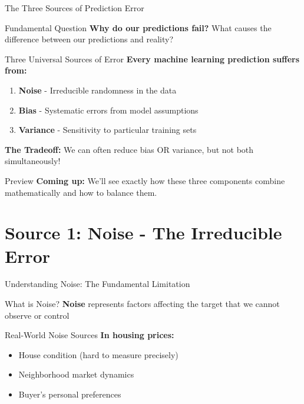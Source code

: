 \documentclass[10pt]{beamer}
\begin{document}
\begin{frame}{The Three Sources of Prediction Error}
\begin{alertbox}{Fundamental Question}
\textbf{Why do our predictions fail?} What causes the difference between our predictions and reality?
\end{alertbox}

\begin{definitionbox}{Three Universal Sources of Error}
\textbf{Every machine learning prediction suffers from:}
\begin{enumerate}
\item \textbf{Noise} - Irreducible randomness in the data
\item \textbf{Bias} - Systematic errors from model assumptions
\item \textbf{Variance} - Sensitivity to particular training sets
\end{enumerate}
\end{definitionbox}

\begin{keypointsbox}
\textbf{The Tradeoff:} We can often reduce bias OR variance, but not both simultaneously!
\end{keypointsbox}

\begin{examplebox}{Preview}
\textbf{Coming up:} We'll see exactly how these three components combine mathematically and how to balance them.
\end{examplebox}
\end{frame}

\section{Source 1: Noise - The Irreducible Error}

\begin{frame}{Understanding Noise: The Fundamental Limitation}
\begin{definitionbox}{What is Noise?}
\textbf{Noise} represents factors affecting the target that we cannot observe or control
\end{definitionbox}

\begin{examplebox}{Real-World Noise Sources}
\textbf{In housing prices:}
\begin{itemize}
\item House condition (hard to measure precisely)
\item Neighborhood market dynamics
\item Buyer's personal preferences
\end{itemize}
\end{examplebox}
\end{frame}
\end{document}
